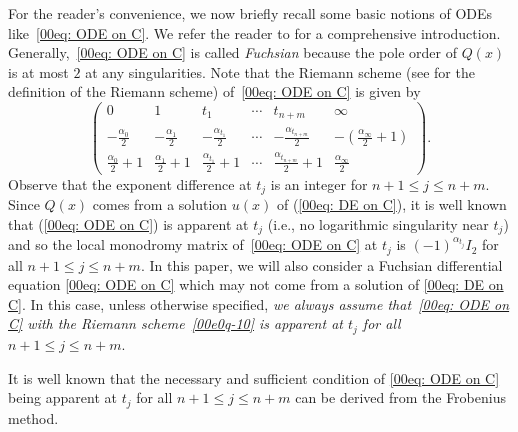\documentclass[10pt,a4paper]{amsart}
\numberwithin{equation}{section}
\begin{document}
For the reader's convenience, we now briefly recall some basic notions
of ODEs like~\eqref{00eq: ODE on C}. We refer the reader to
\cite{Yoshida,Whittaker-Watson} for a comprehensive
introduction. Generally,~\eqref{00eq: ODE on C} is called
\emph{Fuchsian} because the pole order of $Q(x)$ is at most $2$ at any
singularities.
Note that the Riemann scheme (see \cite[p.~11]{Yoshida} for the definition of the Riemann scheme) of~\eqref{00eq: ODE on C} is
 given by
\begin{equation}\label{00e0q-10}\begin{pmatrix}
0&1&t_1&\cdots& t_{n+m}&\infty\\
-\frac{{\alpha}_0}{2} &-\frac{{\alpha}_1}{2}&-\frac{{\alpha}_{t_1}}{2}&\cdots&-\frac{{\alpha}_{t_{n+m}}}{2}&-(\frac{{\alpha}_\infty}{2}+1)\\
\frac{{\alpha}_0}{2}+1&\frac{{\alpha}_1}{2}+1&\frac{{\alpha}_{t_1}}{2}+1&\cdots&\frac{{\alpha}_{t_{n+m}}}{2}+1&\frac{{\alpha}_\infty}{2}
\end{pmatrix}.\end{equation}
Observe that the exponent difference at $t_j$ is an integer for
$n+1\leq j\leq n+m$.
Since $Q(x)$ comes from a solution $u(x)$ of (\ref{00eq: DE on C}), it is well known that
(\ref{00eq: ODE on C}) is apparent at $t_j$ \big(i.e., no logarithmic
singularity near $t_j$\big) and so
the local monodromy matrix of~\eqref{00eq: ODE on C} at $t_j$ is
$(-1)^{{\alpha}_{t_j}}I_2$ for all $n+1\leq j\leq n+m$.
In this paper, we will also consider a Fuchsian differential equation
\eqref{00eq: ODE on C} which may not come from a solution of
\eqref{00eq: DE on C}. In this case, unless otherwise specified,
\emph{we always assume that~\eqref{00eq: ODE on C} with the Riemann
 scheme~\eqref{00e0q-10} is apparent at $t_j$ for all $n+1\leq j\leq
 n+m$}.

It is well known that the necessary and sufficient condition of
\eqref{00eq: ODE on C} being apparent at $t_j$ for all $n+1\leq j\leq
n+m$ can be derived from the Frobenius method.
\end{document}
